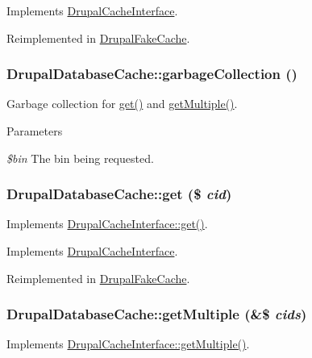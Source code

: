 Implements \hyperlink{interfaceDrupalCacheInterface_a5c8e341f653337185feff4ddc30c1b48}{DrupalCacheInterface}.

Reimplemented in \hyperlink{classDrupalFakeCache_a524fb90590bc66f8dd8960e6f93de943}{DrupalFakeCache}.\hypertarget{classDrupalDatabaseCache_ab29683fb16e22bae9029912548ffa67b}{
\subsubsection[{garbageCollection}]{\setlength{\rightskip}{0pt plus 5cm}DrupalDatabaseCache::garbageCollection ()}}
\label{classDrupalDatabaseCache_ab29683fb16e22bae9029912548ffa67b}
Garbage collection for \hyperlink{classDrupalDatabaseCache_a66a573f6f3e13198b1e95fdc4bd14f8e}{get()} and \hyperlink{classDrupalDatabaseCache_ad9f421906b15c039f1842cf8c14e8768}{getMultiple()}.


\begin{DoxyParams}{Parameters}
\item[{\em \$bin}]The bin being requested. \end{DoxyParams}
\hypertarget{classDrupalDatabaseCache_a66a573f6f3e13198b1e95fdc4bd14f8e}{
\subsubsection[{get}]{\setlength{\rightskip}{0pt plus 5cm}DrupalDatabaseCache::get (\$ {\em cid})}}
\label{classDrupalDatabaseCache_a66a573f6f3e13198b1e95fdc4bd14f8e}
Implements \hyperlink{interfaceDrupalCacheInterface_ad5e2988b3cb4633f473ebf0f889d088f}{DrupalCacheInterface::get()}. 

Implements \hyperlink{interfaceDrupalCacheInterface_ad5e2988b3cb4633f473ebf0f889d088f}{DrupalCacheInterface}.

Reimplemented in \hyperlink{classDrupalFakeCache_aaab8fb6e1a78691e81e0f3d48d4edbad}{DrupalFakeCache}.\hypertarget{classDrupalDatabaseCache_ad9f421906b15c039f1842cf8c14e8768}{
\subsubsection[{getMultiple}]{\setlength{\rightskip}{0pt plus 5cm}DrupalDatabaseCache::getMultiple (\&\$ {\em cids})}}
\label{classDrupalDatabaseCache_ad9f421906b15c039f1842cf8c14e8768}
Implements \hyperlink{interfaceDrupalCacheInterface_aee8c869921fff61654d12099237763dc}{DrupalCacheInterface::getMultiple()}. 

